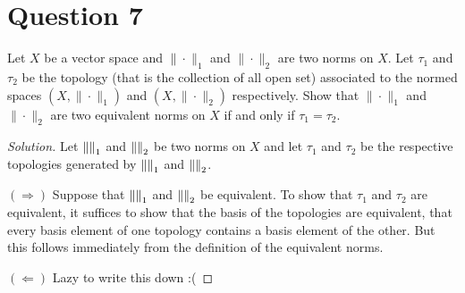 \section{Question 7}
\horz
 Let $X$ be a vector space and $\|\cdot\|_1$ and $\|\cdot\|_2$ are two norms on $X.$ Let $\tau_1$ and $\tau_2$ be the topology (that is the collection of all open set) associated to the  normed spaces $(X,\|\cdot\|_1)$ and $(X,\|\cdot\|_2)$ respectively. Show that $\|\cdot\|_1$ and $\|\cdot\|_2$ are two equivalent norms on $X$ if and only if $\tau_1=\tau_2.$
\horz
\begin{proof}[Solution]
    Let $\left\lVert  \right\rVert_{1}$ and $\left\lVert  \right\rVert_{2}$ be two norms on $X$ and let $\tau_{1}$ and $\tau_{2}$ be the respective topologies generated by $\left\lVert  \right\rVert_{1}$ and $\left\lVert  \right\rVert_{2}$.

    $\left( \Longrightarrow \right)$ Suppose that $\left\lVert  \right\rVert_{1}$ and $\left\lVert  \right\rVert_{2}$ be equivalent. To show that $\tau_{1}$ and $\tau_{2}$ are equivalent, it suffices to show that the basis of the topologies are equivalent, that every basis element of one topology contains a basis element of the other. But this follows immediately from the definition of the equivalent norms.

    $\left( \Longleftarrow \right)$ Lazy to write this down :(
\end{proof}
